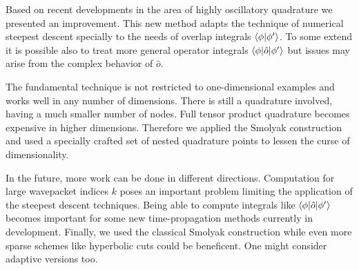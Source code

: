 \documentclass[a4paper,10pt]{article}
\begin{document}
Based on recent developments in the area of highly oscillatory quadrature
we presented an improvement. This new method adapts the technique of numerical
steepest descent specially to the needs of overlap integrals $\braket{\phi|\phi^\prime}$.
To some extend it is possible also to treat more general operator integrals
$\braket{\phi|\hat{o}|\phi^\prime}$ but issues may arise from the complex behavior
of $\hat{o}$.

The fundamental technique is not restricted to one-dimensional examples and works well
in any number of dimensions. There is still a quadrature involved, having a much smaller
number of nodes. Full tensor product quadrature becomes expensive in higher dimensions.
Therefore we applied the Smolyak construction and used a specially crafted set of nested
quadrature points to lessen the curse of dimensionality.

In the future, more work can be done in different directions. Computation for large
wavepacket indices $k$ poses an important problem limiting the application of the
steepest descent techniques.
Being able to compute integrals like $\braket{\phi|\hat{o}|\phi^\prime}$ becomes important
for some new time-propagation methods currently in development.
Finally, we used the classical Smolyak construction while even more sparse schemes
like hyperbolic cuts could be beneficent. One might consider adaptive versions too.


\FloatBarrier



\end{document}
